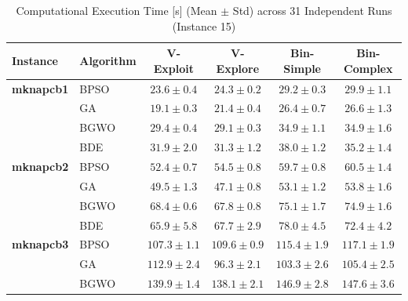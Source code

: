 \begin{table}[htbp]
  \centering
  \small
  \caption{Computational Execution Time [s] (Mean $\pm$ Std) across 31 Independent Runs (Instance 15)}
  \label{tab:computational_cost_inst15}
  \begin{tabular*}{\textwidth}{@{\extracolsep{\fill}}llcccc@{}}
    \toprule
    \textbf{Instance} & \textbf{Algorithm} & \textbf{V-Exploit} & \textbf{V-Explore} & \textbf{Bin-Simple} & \textbf{Bin-Complex} \\
    \midrule
    \textbf{mknapcb1}  & BPSO  &  $\mathbf{23.6 \pm 0.4}$ &           $24.3 \pm 0.2$ &           $29.2 \pm 0.3$ &           $29.9 \pm 1.1$ \\
                       & GA    &  $\mathbf{19.1 \pm 0.3}$ &           $21.4 \pm 0.4$ &           $26.4 \pm 0.7$ &           $26.6 \pm 1.3$ \\
                       & BGWO  &           $29.4 \pm 0.4$ &  $\mathbf{29.1 \pm 0.3}$ &           $34.9 \pm 1.1$ &           $34.9 \pm 1.6$ \\
                       & BDE   &           $31.9 \pm 2.0$ &  $\mathbf{31.3 \pm 1.2}$ &           $38.0 \pm 1.2$ &           $35.2 \pm 1.4$ \\
    \midrule
    \textbf{mknapcb2}  & BPSO  &  $\mathbf{52.4 \pm 0.7}$ &           $54.5 \pm 0.8$ &           $59.7 \pm 0.8$ &           $60.5 \pm 1.4$ \\
                       & GA    &           $49.5 \pm 1.3$ &  $\mathbf{47.1 \pm 0.8}$ &           $53.1 \pm 1.2$ &           $53.8 \pm 1.6$ \\
                       & BGWO  &           $68.4 \pm 0.6$ &  $\mathbf{67.8 \pm 0.8}$ &           $75.1 \pm 1.7$ &           $74.9 \pm 1.6$ \\
                       & BDE   &  $\mathbf{65.9 \pm 5.8}$ &           $67.7 \pm 2.9$ &           $78.0 \pm 4.5$ &           $72.4 \pm 4.2$ \\
    \midrule
    \textbf{mknapcb3}  & BPSO  & $\mathbf{107.3 \pm 1.1}$ &          $109.6 \pm 0.9$ &          $115.4 \pm 1.9$ &          $117.1 \pm 1.9$ \\
                       & GA    &          $112.9 \pm 2.4$ &  $\mathbf{96.3 \pm 2.1}$ &          $103.3 \pm 2.6$ &          $105.4 \pm 2.5$ \\
                       & BGWO  &          $139.9 \pm 1.4$ & $\mathbf{138.1 \pm 2.1}$ &          $146.9 \pm 2.8$ &          $147.6 \pm 3.6$ \\

\end{tabular*}
\end{table}

